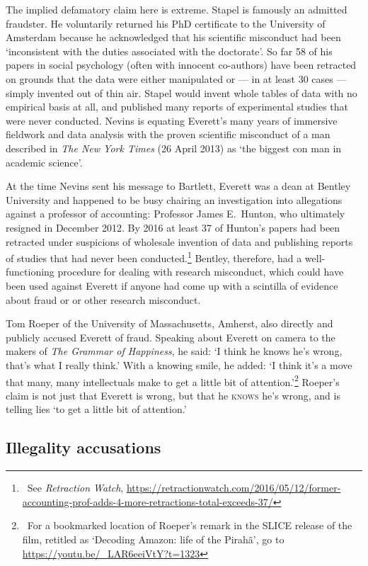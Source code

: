 \documentclass[output=paper,colorlinks,citecolor=brown
]{langscibook}
\begin{document}
The implied defamatory claim here is extreme. Stapel is famously an
admitted fraudster. He voluntarily returned his PhD certificate to
the University of Amsterdam because he acknowledged that his scientific
misconduct had been `inconsistent with the duties associated with the
doctorate'. So far 58 of his papers in social psychology (often with
innocent co-authors) have been retracted on grounds that the data
were either manipulated or --- in at least 30 cases --- simply invented
out of thin air. Stapel would invent whole tables of data with no
empirical basis at all, and published many reports of experimental
studies that were never conducted. Nevins is equating Everett's many
years of immersive fieldwork and data analysis with the proven
scientific misconduct of a man described in \textit{The New York
Times} (26 April 2013) as `the biggest con man in academic science'.

At the time Nevins sent his message to Bartlett, Everett was a dean
at Bentley University and happened to be busy chairing an investigation
into allegations against a professor of accounting: Professor James
E.\ Hunton, who ultimately resigned in December 2012. By 2016 at
least 37 of Hunton's papers had been retracted under suspicions of
wholesale invention of data and publishing reports of studies that
had never been conducted.\footnote{\,
   See \textit{Retraction Watch},
   \url{https://retractionwatch.com/2016/05/12/former-accounting-prof-adds-4-more-retractions-total-exceeds-37/}}
Bentley, therefore, had a well-functioning procedure for dealing with
research misconduct, which could have been used against Everett if
anyone had come up with a scintilla of evidence about fraud or or other
research misconduct.

Tom Roeper of the University of Massachusetts, Amherst, also directly
and publicly accused Everett of fraud. Speaking about Everett on camera
to the makers of \textit{The Grammar of Happiness}, he said: `I think he
knows he's wrong, that's what I really think.' With a knowing smile, he
added: `I think it's a move that many, many intellectuals make to get a
little bit of attention.'\footnote{\,
   For a bookmarked location of Roeper's remark in the SLICE release
   of the film, retitled as `Decoding Amazon: life of the Pirah{\~a}',
   go to \url{https://youtu.be/_LAR6eeiVtY?t=1323}}
Roeper's claim is not just that Everett is wrong, but that he
\textsc{knows} he's wrong, and is telling lies `to get a little bit
of attention.'

\subsection{Illegality accusations}
\end{document}
